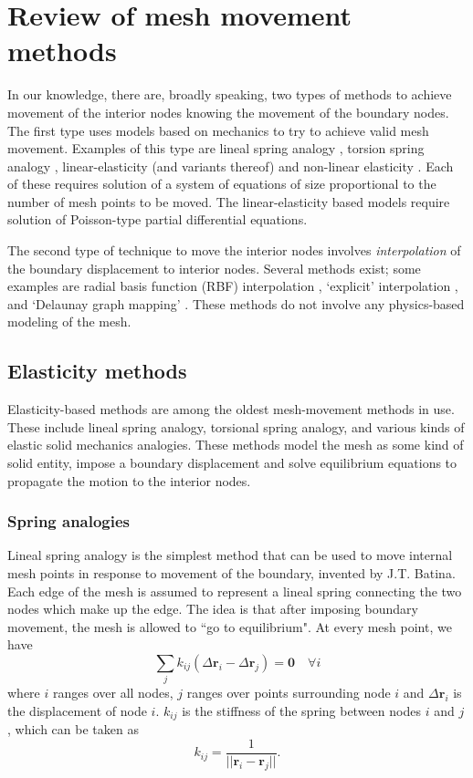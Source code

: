 \chapter{Review of mesh movement methods}

 In our knowledge, there are, broadly speaking, two types of methods to achieve movement of the interior nodes knowing the movement of the boundary nodes. The first type uses models based on mechanics to try to achieve valid mesh movement. Examples of this type are lineal spring analogy \cite{mm:batina}, torsion spring analogy \cite{mm:torsionsprings}, linear-elasticity (and variants thereof)\cite{curve:hartmann} and non-linear elasticity \cite{curve:persson}. Each of these requires solution of a system of equations of size proportional to the number of mesh points to be moved. The linear-elasticity based models require solution of Poisson-type partial differential equations.
 
 The second type of technique to move the interior nodes involves \emph{interpolation} of the boundary displacement to interior nodes. Several methods exist; some examples are radial basis function (RBF) interpolation \cite{mm:rbf}, `explicit' interpolation \cite{mm:explicit}, and `Delaunay graph mapping' \cite{mm:dgm}. These methods do not involve any physics-based modeling of the mesh.
 
 \section{Elasticity methods}
 Elasticity-based methods are among the oldest mesh-movement methods in use. These include lineal spring analogy, torsional spring analogy, and various kinds of elastic solid mechanics analogies. These methods model the mesh as some kind of solid entity, impose a boundary displacement and solve equilibrium equations to propagate the motion to the interior nodes.
 
 \subsection{Spring analogies}
 
 Lineal spring analogy is the simplest method that can be used to move internal mesh points in response to movement of the boundary, invented by J.T. Batina. Each edge of the mesh is assumed to represent a lineal spring connecting the two nodes which make up the edge. The idea is that after imposing boundary movement, the mesh is allowed to ``go to equilibrium". At every mesh point, we have
 \begin{equation}
 \sum_j k_{ij}(\Delta \mathbf{r}_i - \Delta \mathbf{r}_j) = \mathbf{0} \quad \forall i
 \label{spring}
 \end{equation}
 where $i$ ranges over all nodes, $j$ ranges over points surrounding node $i$ and $\Delta \mathbf{r}_i$ is the displacement of node $i$.
 $k_{ij}$ is the stiffness of the spring between nodes $i$ and $j$, which can be taken as
 \begin{equation}
 k_{ij} = \frac{1}{||\mathbf{r}_i - \mathbf{r}_j||}.
 \end{equation}
 
